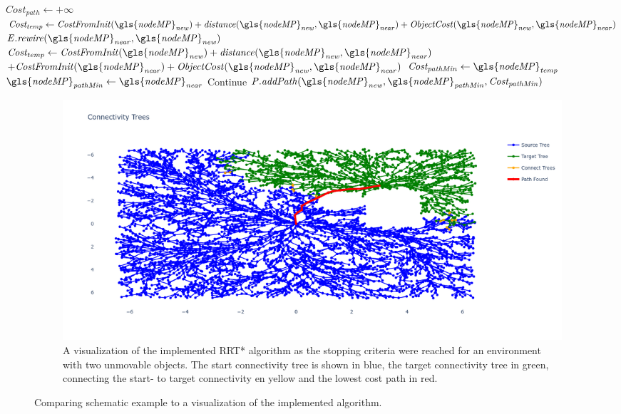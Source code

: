 \begin{algorithm}[H]
\begin{algorithmic}[1]
{{\hspace{-0.1cm}\colorbox{my_green}{\parbox{\linewidth}{%
    \State $\mathit{Cost_{path}} \leftarrow +\infty$ 
    \State $\mathit{Cost_{temp}} \leftarrow \mathit{CostFromInit(\gls{nodeMP}_{new}) + distance(\gls{nodeMP}_{new}, \gls{nodeMP}_{near}) + ObjectCost(\gls{nodeMP}_{new}, \gls{nodeMP}_{near})}$
    \State $\mathit{E.rewire(\gls{nodeMP}_{near}, \gls{nodeMP}_{new})}$
        \EndIf
      \Else {}
      \State $\mathit{Cost_{temp} \leftarrow CostFromInit(\gls{nodeMP}_{new}) + distance(\gls{nodeMP}_{new}, \gls{nodeMP}_{near})} $ \newline\hspace*{10em} $+ \mathit{CostFromInit(\gls{nodeMP}_{near}) + ObjectCost(\gls{nodeMP}_{new}, \gls{nodeMP}_{near})}$
          \State $\mathit{Cost_{pathMin} \leftarrow \gls{nodeMP}_{temp}}$
          \State $\mathit{\gls{nodeMP}_{pathMin} \leftarrow \gls{nodeMP}_{near}}$
          \EndIf
      \EndIf
          \State Continue
      \Else
      \State $\mathit{P.addPath(\gls{nodeMP}_{new}, \gls{nodeMP}_{pathMin}, Cost_{pathMin})}$
      \EndIf
    \EndFor
}}
\EndWhile
}}
\end{algorithmic}
\end{algorithm}

\begin{figure}[H]
    \centering

    \begin{subfigure}{\textwidth}
    \hspace{-0.7cm}
    \includegraphics[width=1.1\textwidth]{figures/required_background/mp/mp_the_real_deal.png}
    \caption{A visualization of the implemented \acs{RRT*} algorithm as the stopping criteria were reached for an environment with two unmovable objects. The start connectivity tree is shown in blue, the target connectivity tree in green, connecting the start- to target connectivity en yellow and the lowest cost path in red.}
    \end{subfigure}
    \label{fig:motion_planner_comparison}%
    \caption{Comparing schematic example to a visualization of the implemented algorithm.}
\end{figure}
